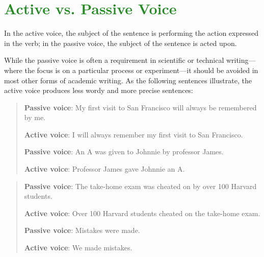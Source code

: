 
\section{\textcolor{ForestGreen}{Active vs. Passive Voice}}



In the active voice, the subject of the sentence is performing the action expressed in the verb; in the passive voice, the subject of the sentence is acted upon. 

While the passive voice is often a requirement in scientific or technical writing---where the focus is on a particular process or experiment---it should be avoided in most other forms of academic writing. As the following sentences illustrate, the active voice produces less wordy and more precise sentences:

\begin{quote}
 
\textbf{Passive voice}: My first visit to San Francisco will always be remembered by me.

\textbf{Active voice}: I will always remember my first visit to San Francisco.

\textbf{Passive voice}: 	An A was given to Johnnie by professor James.

\textbf{Active voice}: 	Professor James gave Johnnie an A.
\end{quote}

\begin{quote}
\textbf{Passive voice}: The take-home exam was cheated on by over 100 Harvard students.

\textbf{Active voice}: Over 100 Harvard students cheated on the take-home exam.

\textbf{Passive voice}: Mistakes were made.

\textbf{Active voice}: We made mistakes.

\end{quote}

